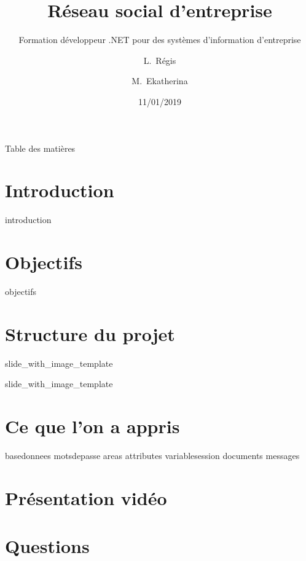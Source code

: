 \documentclass{beamer}
\title[Présentation de Projet RSE] %
{Réseau social d'entreprise}
\subtitle
{ Formation développeur .NET pour des systèmes d'information d'entreprise} %
\author[Régis, Ekatherina] %
{L.~Régis \and M.~Ekatherina}
\date[Short Occasion] %
{11/01/2019}
\begin{document}
\begin{frame}
  \titlepage
\end{frame}

\begin{frame}{Table des matières}
  \tableofcontents
\end{frame}




\section{Introduction}
 {introduction}
\section{Objectifs}
 {objectifs}
\section{Structure du projet}
\def\titlename{Structure du projet}
\def\imagepath{images/dataflow.png}
 {slide_with_image_template}

\def\titlename{Carte du site}
\def\imagepath{images/sitemap.png}
 {slide_with_image_template}

\section{Ce que l'on a appris}
 {basedonnees}
 {motsdepasse}
 {areas}
 {attributes}
 {variablesession}
 {documents}
 {messages}



\section{Présentation vidéo}


\section{Questions}

\end{document}
